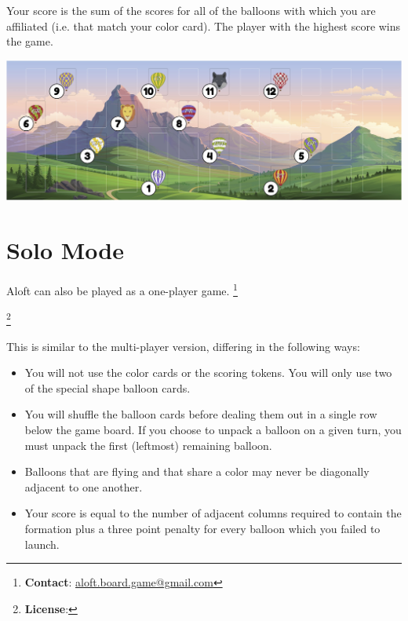 \documentclass[a6paper, 11pt, parskip=half, DIV=15]{scrartcl}
\newcommand\blfootnote[1]{%
  \begingroup
  \renewcommand\thefootnote{}\footnote{#1}%
  \addtocounter{footnote}{-1}%
  \endgroup
}
\renewcommand{\thefootnote}{\fnsymbol{footnote}}
\begin{document}

Your score is the sum of the scores for all of the balloons with which you are affiliated (i.e. that match your color card). The player with the highest score wins the game.

\begin{center}
\includegraphics[scale=0.115]{scoring_diagram.jpg}
\end{center}

\newpage
\enlargethispage{1.75\baselineskip}
\section*{Solo Mode}
Aloft can also be played as a one-player game.
\blfootnote{\textbf{Contact}: \href{mailto:aloft.board.game@gmail.com}{aloft.board.game@gmail.com}}
\blfootnote{\textbf{License}: \raggedright\doclicenseLongText}
This is similar to the multi-player version, differing in the following ways:
\begin{itemize}
  \item You will not use the color cards or the scoring tokens. You will only use two of the special shape balloon cards.
  \item You will shuffle the balloon cards before dealing them out in a single row below the game board. If you choose to unpack a balloon on a given turn, you must unpack the first (leftmost) remaining balloon.
  \item Balloons that are flying and that share a color may never be diagonally adjacent to one another.
  \item Your score is equal to the number of adjacent columns required to contain the formation plus a three point penalty for every balloon which you failed to launch.
\end{itemize}
 \newpage
\phantom{Aloft}
\end{document}
